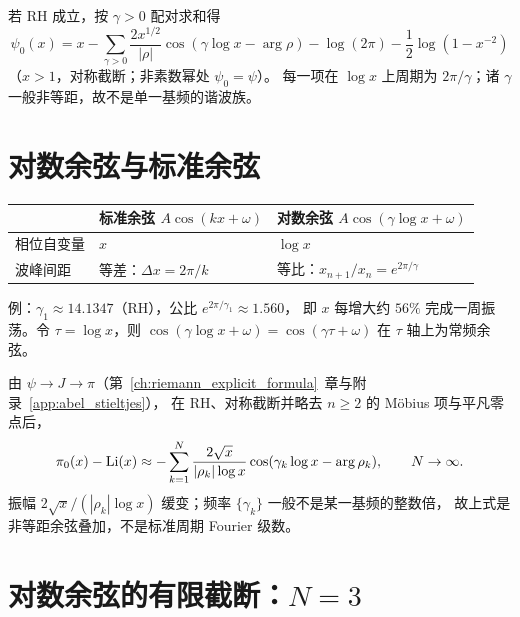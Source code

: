 若 RH 成立，按 $\gamma>0$ 配对求和得
\begin{equation}
\boxed{\psi_0(x)=x-\sum_{\gamma>0}\frac{2x^{1/2}}{|\rho|}\cos(\gamma\log x-\arg\rho)
-\log(2\pi)-\frac12\log(1-x^{-2})}
\label{eq:cosine_psi}
\end{equation}
（$x>1$，对称截断；非素数幂处 $\psi_0=\psi$）。
每一项在 $\log x$ 上周期为 $2\pi/\gamma$；诸 $\gamma$ 一般非等距，故不是单一基频的谐波族。

\section{对数余弦与标准余弦}

\begin{center}
\renewcommand{\arraystretch}{1.45}
\begin{tabular}{@{}lll@{}}
\toprule
 & 标准余弦 $A\cos(kx+\omega)$ & 对数余弦 $A\cos(\gamma\log x+\omega)$ \\
\midrule
相位自变量 & $x$ & $\log x$ \\
波峰间距 & 等差：$\Delta x=2\pi/k$ & 等比：$x_{n+1}/x_n=e^{2\pi/\gamma}$ \\
\bottomrule
\end{tabular}
\end{center}

例：$\gamma_1\approx 14.1347$（RH），公比 $e^{2\pi/\gamma_1}\approx 1.560$，
即 $x$ 每增大约 $56\%$ 完成一周振荡。令 $\tau=\log x$，则
$\cos(\gamma\log x+\omega)=\cos(\gamma\tau+\omega)$ 在 $\tau$ 轴上为常频余弦。

由 $\psi\to J\to\pi$（第~\ref{ch:riemann_explicit_formula}~章与附录~\ref{app:abel_stieltjes}），
在 RH、对称截断并略去 $n\ge 2$ 的 M\"obius 项与平凡零点后，
\begin{equation}
\pi_0(x)-\operatorname{Li}(x)
\approx -\sum_{k=1}^{N}\frac{2\sqrt{x}}{|\rho_k|\log x}
\cos(\gamma_k\log x-\arg\rho_k),\qquad N\to\infty.
\label{eq:riemann}
\end{equation}
振幅 $2\sqrt{x}/(|\rho_k|\log x)$ 缓变；频率 $\{\gamma_k\}$ 一般不是某一基频的整数倍，
故上式是非等距余弦叠加，不是标准周期 Fourier 级数。

\section{对数余弦的有限截断：\texorpdfstring{$N=3$}{N=3}}\label{sec:n3_principle}

